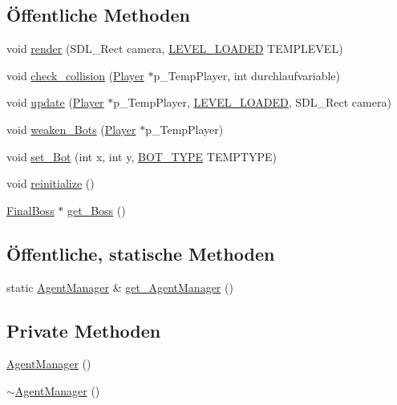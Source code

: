 \subsection*{Öffentliche Methoden}
\begin{DoxyCompactItemize}
\item 
void \hyperlink{class_agent_manager_a1b94eb002a1a9a57106539b84402f32a}{render} (S\-D\-L\-\_\-\-Rect camera, \hyperlink{globals_8h_a3951bd57665e2e4c8a4411c2a5477207}{L\-E\-V\-E\-L\-\_\-\-L\-O\-A\-D\-E\-D} T\-E\-M\-P\-L\-E\-V\-E\-L)
\item 
void \hyperlink{class_agent_manager_a5548da9e3f247e8dd4a9eb98748fd3df}{check\-\_\-collision} (\hyperlink{class_player}{Player} $\ast$p\-\_\-\-Temp\-Player, int durchlaufvariable)
\item 
void \hyperlink{class_agent_manager_a1c05e1578aafde1892a5e4e79862b19f}{update} (\hyperlink{class_player}{Player} $\ast$p\-\_\-\-Temp\-Player, \hyperlink{globals_8h_a3951bd57665e2e4c8a4411c2a5477207}{L\-E\-V\-E\-L\-\_\-\-L\-O\-A\-D\-E\-D}, S\-D\-L\-\_\-\-Rect camera)
\item 
void \hyperlink{class_agent_manager_aafa2ae19bfa65b44dc3c955bd21e0fc3}{weaken\-\_\-\-Bots} (\hyperlink{class_player}{Player} $\ast$p\-\_\-\-Temp\-Player)
\item 
void \hyperlink{class_agent_manager_ab00a9cbf5753546fbb5f9f5cfa1b1241}{set\-\_\-\-Bot} (int x, int y, \hyperlink{globals_8h_aaf436d1bc29db707b62c299461f32ee7}{B\-O\-T\-\_\-\-T\-Y\-P\-E} T\-E\-M\-P\-T\-Y\-P\-E)
\item 
void \hyperlink{class_agent_manager_abc1499700649f6af77205fedc0698085}{reinitialize} ()
\item 
\hyperlink{class_final_boss}{Final\-Boss} $\ast$ \hyperlink{class_agent_manager_a13afeaa1a5581415e3b312444bb43b82}{get\-\_\-\-Boss} ()
\end{DoxyCompactItemize}
\subsection*{Öffentliche, statische Methoden}
\begin{DoxyCompactItemize}
\item 
static \hyperlink{class_agent_manager}{Agent\-Manager} \& \hyperlink{class_agent_manager_a1af0e6f1ed0b2b4db25617f4e9357e81}{get\-\_\-\-Agent\-Manager} ()
\end{DoxyCompactItemize}
\subsection*{Private Methoden}
\begin{DoxyCompactItemize}
\item 
\hyperlink{class_agent_manager_a49ff5a8f60bae1c0b8d6c9aeda8f6961}{Agent\-Manager} ()
\item 
\hyperlink{class_agent_manager_a6b3efb95b74c9c96b9dbaf0868f17759}{$\sim$\-Agent\-Manager} ()
\end{DoxyCompactItemize}
